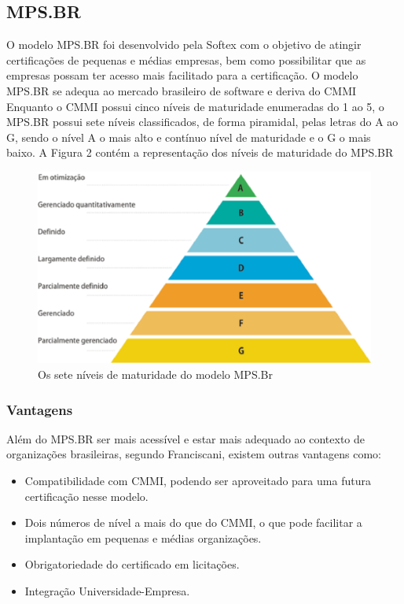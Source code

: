 \subsection{MPS.BR}

  O modelo MPS.BR foi desenvolvido pela Softex com o objetivo de atingir
  certificações de pequenas e médias empresas, bem como possibilitar que
  as empresas possam ter acesso mais facilitado para a certificação.
  O modelo MPS.BR se adequa ao mercado brasileiro de software e deriva do CMMI
  Enquanto o CMMI possui cinco níveis de maturidade enumeradas do 1 ao 5, o
  MPS.BR possui sete níveis classificados, de forma piramidal,  pelas letras
  do A ao G, sendo o nível A o mais alto e contínuo nível de maturidade e o G
  o mais baixo. A Figura 2 contém a representação dos níveis de maturidade do
  MPS.BR

  \begin{figure}[!ht]
    \centering
    \includegraphics[width=15cm, keepaspectratio=true]{figuras/maturidade/niveis-mpsbr.eps}
    \caption{Os sete níveis de maturidade do modelo MPS.Br}
  \end{figure}

\subsubsection{Vantagens}

  Além do MPS.BR ser mais acessível e estar mais adequado ao contexto de
  organizações brasileiras, segundo Franciscani, existem outras vantagens
  como:

  \begin{itemize}
    \item{Compatibilidade com CMMI, podendo ser aproveitado para uma futura
          certificação nesse modelo.}
    \item{Dois números de nível a mais do que do CMMI, o que pode facilitar a
          implantação em pequenas e médias organizações.}
    \item{Obrigatoriedade do certificado em licitações.}
    \item{Integração Universidade-Empresa.}
  \end{itemize}

